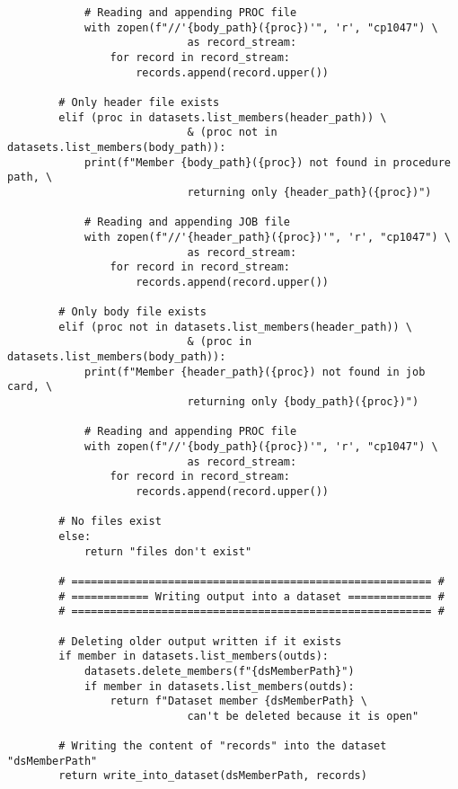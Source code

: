 \begin{lstlisting}
            # Reading and appending PROC file
            with zopen(f"//'{body_path}({proc})'", 'r', "cp1047") \
                            as record_stream:
                for record in record_stream:
                    records.append(record.upper())
        
        # Only header file exists
        elif (proc in datasets.list_members(header_path)) \
                            & (proc not in datasets.list_members(body_path)):
            print(f"Member {body_path}({proc}) not found in procedure path, \
                            returning only {header_path}({proc})")
            
            # Reading and appending JOB file
            with zopen(f"//'{header_path}({proc})'", 'r', "cp1047") \
                            as record_stream:
                for record in record_stream:
                    records.append(record.upper())
        
        # Only body file exists
        elif (proc not in datasets.list_members(header_path)) \
                            & (proc in datasets.list_members(body_path)):
            print(f"Member {header_path}({proc}) not found in job card, \
                            returning only {body_path}({proc})")
            
            # Reading and appending PROC file
            with zopen(f"//'{body_path}({proc})'", 'r', "cp1047") \
                            as record_stream:
                for record in record_stream:
                    records.append(record.upper())
                    
        # No files exist 
        else:
            return "files don't exist"
        
        # ======================================================== #
        # ============ Writing output into a dataset ============= #
        # ======================================================== #
        
        # Deleting older output written if it exists
        if member in datasets.list_members(outds):
            datasets.delete_members(f"{dsMemberPath}")
            if member in datasets.list_members(outds):
                return f"Dataset member {dsMemberPath} \
                            can't be deleted because it is open"
                
        # Writing the content of "records" into the dataset "dsMemberPath"   
        return write_into_dataset(dsMemberPath, records)
    

\end{lstlisting}
